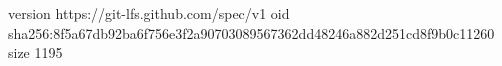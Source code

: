 version https://git-lfs.github.com/spec/v1
oid sha256:8f5a67db92ba6f756e3f2a90703089567362dd48246a882d251cd8f9b0c11260
size 1195
